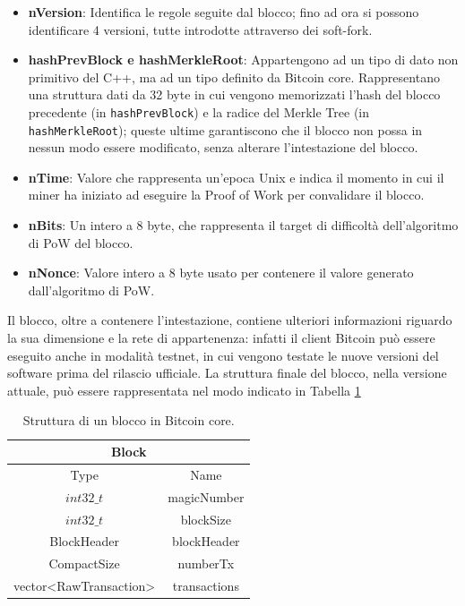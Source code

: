 \begin{itemize}
  \item {\bf nVersion\/}: Identifica le regole seguite dal blocco; fino ad ora si possono identificare 4 versioni, tutte introdotte attraverso dei soft-fork.
  \item {\bf hashPrevBlock e hashMerkleRoot\/}: Appartengono ad un tipo di dato non primitivo del C++, ma ad un tipo definito da Bitcoin core. Rappresentano una struttura dati da 32 byte in cui vengono memorizzati l’hash del blocco precedente (in {\tt{hashPrevBlock}}) e la radice del Merkle Tree (in {\tt{hashMerkleRoot}}); queste ultime garantiscono che il blocco non possa in nessun modo essere modificato, senza alterare l’intestazione del blocco.
  \item {\bf nTime\/}: Valore che rappresenta un’epoca Unix e indica il momento in cui il miner ha iniziato ad eseguire la Proof of Work per convalidare il blocco.
  \item {\bf nBits\/}: Un intero a 8 byte, che rappresenta il target di difficoltà dell’algoritmo di PoW del blocco.
  \item {\bf nNonce\/}: Valore intero a 8 byte usato per contenere il valore generato dall’algoritmo di PoW.
\end{itemize}

Il blocco, oltre a contenere l’intestazione, contiene ulteriori informazioni riguardo la sua dimensione e la rete di appartenenza: infatti il client Bitcoin può essere eseguito anche in modalità testnet, in cui vengono testate le nuove versioni del software prima del rilascio ufficiale.
La struttura finale del blocco, nella versione attuale, può essere rappresentata nel modo indicato in Tabella \ref{tab:blockbitcoinc}

\begin{table}
       \centering\small
           \begin{tabular}{|c|c|}
               \hline
                 \multicolumn{2}{|c|}{\textbf{Block}} \\
                 \hline
                 \multicolumn{1}{|c|}{Type} & \multicolumn{1}{c|}{Name} \\
               \hline \hline
               $int32\_t$ & magicNumber   \\
               \hline
               $int32\_t$ & blockSize \\
               \hline
               BlockHeader & blockHeader \\
               \hline
               CompactSize & numberTx \\
               \hline
               vector<RawTransaction> & transactions \\
               \hline
       \end{tabular}
       \caption{Struttura di un blocco in Bitcoin core.\label{tab:blockbitcoinc}}
   \end{table}

